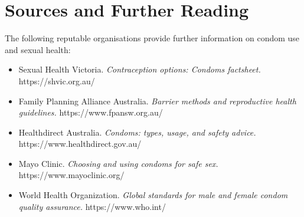 \section*{Sources and Further Reading}
The following reputable organisations provide further information on condom use and sexual health:
\begin{itemize}
    \item Sexual Health Victoria. \textit{Contraception options: Condoms factsheet.} https://shvic.org.au/
    \item Family Planning Alliance Australia. \textit{Barrier methods and reproductive health guidelines.} https://www.fpansw.org.au/
    \item Healthdirect Australia. \textit{Condoms: types, usage, and safety advice.} https://www.healthdirect.gov.au/
    \item Mayo Clinic. \textit{Choosing and using condoms for safe sex.} https://www.mayoclinic.org/
    \item World Health Organization. \textit{Global standards for male and female condom quality assurance.} https://www.who.int/
\end{itemize}
